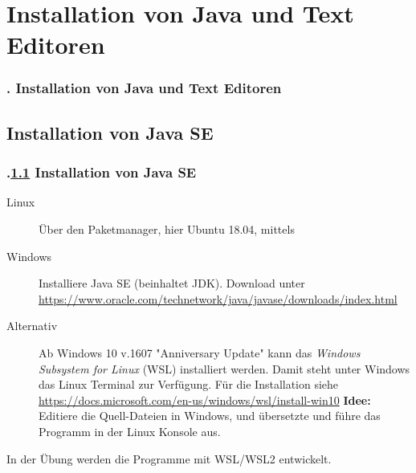 \AtBeginSection{}
\section{Installation von Java und Text Editoren}
\begin{frame}
  \frametitle{\kap. Installation von Java und Text Editoren}%
\tableofcontents[current]
\end{frame}


\def\stitle{Installation von Java SE}%
\subsection{\stitle}\label{S:Compiler}
\begin{frame}[t]%
  \frametitle{\kap.\ref{S:Compiler} \stitle}%

\begin{description}
  \item [Linux] \"Uber den Paketmanager, hier Ubuntu 18.04, mittels \\
  \item[Windows] Installiere Java SE (beinhaltet JDK). Download unter \textcolor{KITblue}{\url{https://www.oracle.com/technetwork/java/javase/downloads/index.html}}
  \item[Alternativ] Ab Windows 10 v.1607 "{}Anniversary Update"{} kann das \emph{Windows Subsystem for Linux} (WSL) installiert werden.
    Damit steht unter Windows das Linux Terminal zur Verfügung.
    F\"ur die Installation siehe \textcolor{KITblue}{\url{https://docs.microsoft.com/en-us/windows/wsl/install-win10}}
    \textbf{Idee:} Editiere die Quell-Dateien in Windows, und übersetzte und führe das Programm in der Linux Konsole aus.
\end{description}

\vfill
In der Übung werden die Programme mit WSL/WSL2 entwickelt.
\end{frame}


\def\stitle{Editoren}%
